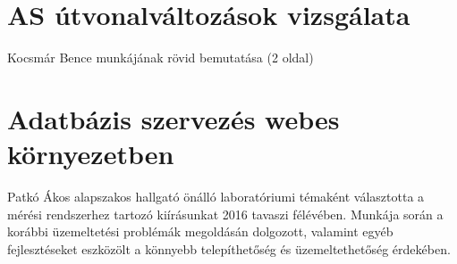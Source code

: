 \section{AS útvonalváltozások vizsgálata}
Kocsmár Bence munkájának rövid bemutatása (2 oldal)

\section{Adatbázis szervezés webes környezetben}

Patkó Ákos alapszakos hallgató önálló laboratóriumi témaként választotta a mérési rendszerhez tartozó kiírásunkat 2016 tavaszi félévében. Munkája során a korábbi üzemeltetési problémák megoldásán dolgozott, valamint egyéb fejlesztéseket eszközölt a könnyebb telepíthetőség és üzemeltethetőség érdekében.















